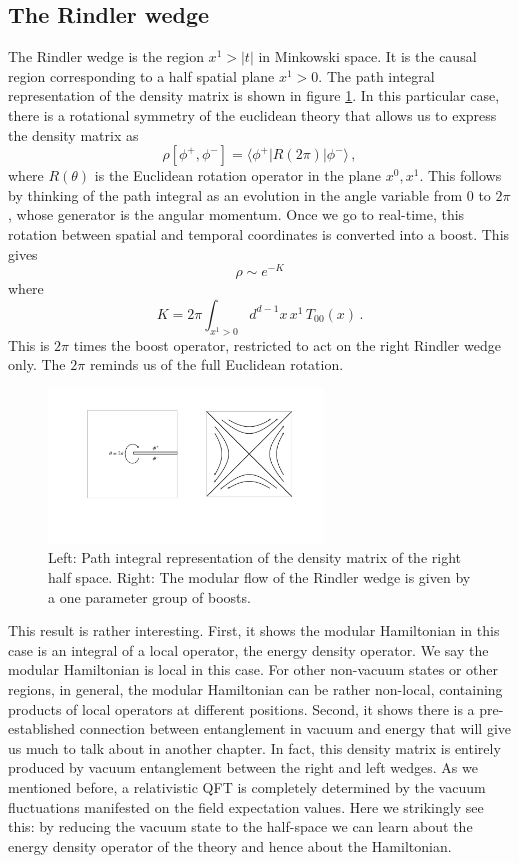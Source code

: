 \documentclass[11pt]{article}
\numberwithin{equation}{section}
\newcommand{\be}{\begin{equation}}
\newcommand{\ee}{\end{equation}}
\begin{document}
\subsection{The Rindler wedge}
\label{rw}
The Rindler wedge is the region $x^1>|t|$ in Minkowski space. It is the causal region corresponding to a half spatial plane $x^1>0$. The path integral representation of the density matrix is shown in figure \ref{rindler}. In this particular case, there is a rotational symmetry of the euclidean theory that allows us to express the density matrix as  
\be
\rho[\phi^+,\phi^-]=\langle \phi^+| R(2\pi) |\phi^- \rangle\,,
\ee
where $R(\theta)$ is the Euclidean rotation operator in the plane $x^0,x^1$. 
This follows by thinking of the path integral as an evolution in the angle variable from $0$ to $2\pi$, whose generator is the angular momentum.  
Once we go to real-time, this rotation between spatial and temporal coordinates is converted into a boost. This gives
\be
\rho\sim e^{- K}\label{pico}
\ee
where
\be
K=2 \pi \int_{x^1>0} d^{d-1}x\,  x^1\, T_{00}(x)\,.\label{pico1}
\ee
This is $2 \pi$ times the boost operator, restricted to act on the right Rindler wedge only. The $2\pi$ reminds us of the full Euclidean rotation.  

\begin{figure}[t]
\begin{center}  
\includegraphics[width=0.65\textwidth]{rindler.pdf}
\captionsetup{width=0.9\textwidth}
\caption{Left: Path integral representation of the density matrix of the right half space. Right: The modular flow of the Rindler wedge is given by a one parameter group of boosts.}
\label{rindler}
\end{center}  
\end{figure}

This result is rather interesting. First, it shows the modular Hamiltonian in this case is an integral of a local operator, the energy density operator. We say the modular Hamiltonian is local in this case. For other non-vacuum states or other regions, in general, the modular Hamiltonian can be rather non-local, containing products of local operators at different positions. Second, it shows there is a pre-established connection between entanglement in vacuum and energy that will give us much to talk about in another chapter. In fact, this density matrix is entirely produced by vacuum entanglement between the right and left wedges. As we mentioned before, a relativistic QFT is completely determined by the vacuum fluctuations manifested on the field expectation values. Here we strikingly see this: by reducing the vacuum state to the half-space we can learn about the energy density operator of the theory and hence about the Hamiltonian.      
\end{document}
